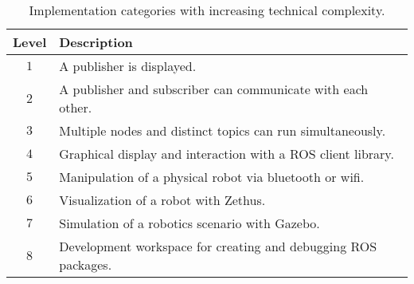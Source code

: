         \begin{table}[htbp]
            \color{textColor}
            \centering	
            \caption{Implementation categories with increasing technical complexity.}
                \begin{tabular}{cl}
                    \toprule
                    \textbf{Level} & \textbf{Description} \\
                    \midrule
                    $1$ & A publisher is displayed. \\ [0.3em]
                    $2$ & A publisher and subscriber can communicate with each other.\\[0.3em]
                    $3$ & Multiple nodes and distinct topics can run simultaneously. \\[0.3em]
                    $4$ & Graphical display and interaction with a ROS client library. \\[0.3em]
                    $5$ & Manipulation of a physical robot via bluetooth or wifi. \\[0.3em]
                    $6$ & Visualization of a robot with Zethus. \\[0.3em]
                    $7$ & Simulation of a robotics scenario with Gazebo. \\[0.3em]
                    $8$ & Development workspace for creating and debugging ROS packages. \\
                \bottomrule
            \end{tabular}\label{tab:techlevels}
        \end{table}






        


        

